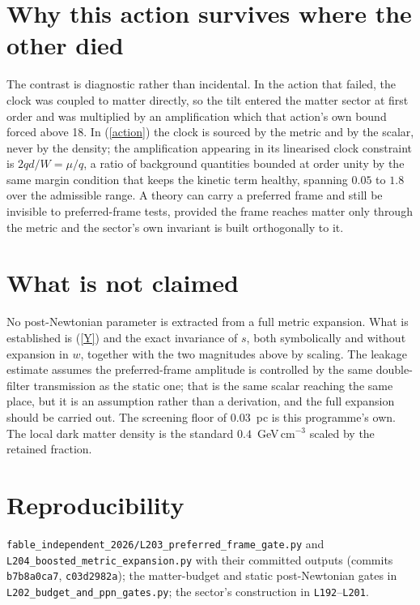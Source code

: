 \documentclass[11pt,letterpaper]{article}
\begin{document}
\section{Why this action survives where the other died}
The contrast is diagnostic rather than incidental. In the action that failed, the clock was coupled to matter directly, so the tilt entered the matter sector at first order and was multiplied by an amplification which that action's own bound forced above 18. In (\ref{action}) the clock is sourced by the metric and by the scalar, never by the density; the amplification appearing in its linearised clock constraint is $2qd/W=\mu/q$, a ratio of background quantities bounded at order unity by the same margin condition that keeps the kinetic term healthy, spanning $0.05$ to $1.8$ over the admissible range. A theory can carry a preferred frame and still be invisible to preferred-frame tests, provided the frame reaches matter only through the metric and the sector's own invariant is built orthogonally to it.

\section{What is not claimed}
No post-Newtonian parameter is extracted from a full metric expansion. What is established is (\ref{Y}) and the exact invariance of $s$, both symbolically and without expansion in $w$, together with the two magnitudes above by scaling. The leakage estimate assumes the preferred-frame amplitude is controlled by the same double-filter transmission as the static one; that is the same scalar reaching the same place, but it is an assumption rather than a derivation, and the full expansion should be carried out. The screening floor of $0.03$~pc is this programme's own. The local dark matter density is the standard $0.4$~GeV\,cm$^{-3}$ scaled by the retained fraction.

\section{Reproducibility}
\texttt{fable\_independent\_2026/L203\_preferred\_frame\_gate.py} and \texttt{L204\_boosted\_metric\_expansion.py} with their committed outputs (commits \texttt{b7b8a0ca7}, \texttt{c03d2982a}); the matter-budget and static post-Newtonian gates in \texttt{L202\_budget\_and\_ppn\_gates.py}; the sector's construction in \texttt{L192}--\texttt{L201}.
\end{document}
